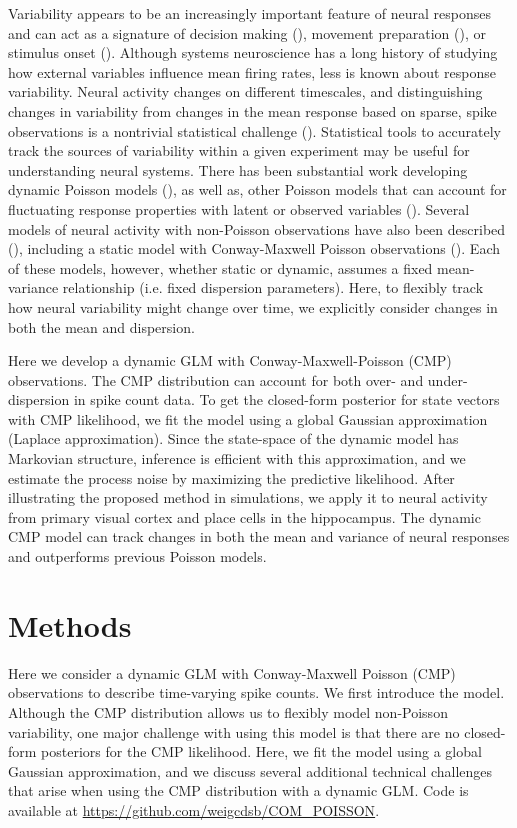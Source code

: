 \documentclass[]{article}
\begin{document}
	Variability appears to be an increasingly important feature of neural responses and can act as a signature of decision making (\cite{Churchland2011}), movement preparation (\cite{Churchland2006}), or stimulus onset (\cite{Churchland2010}). Although systems neuroscience has a long history of studying how external variables influence mean firing rates, less is known about response variability. Neural activity changes on different timescales, and distinguishing changes in variability from changes in the mean response based on sparse, spike observations is a nontrivial statistical challenge (\cite{DeWeese1998}). Statistical tools to accurately track the sources of variability within a given experiment may be useful for understanding neural systems. There has been substantial work developing dynamic Poisson models (\cite{Brown2001,Eden2004}), as well as, other Poisson models that can account for fluctuating response properties with latent or observed variables (\cite{Czanner2008,Smith2003}). Several models of neural activity with non-Poisson observations have also been described (\cite{DeWeese2003,Gao2015,Pillow2012}), including a static model with Conway-Maxwell Poisson observations (\cite{Stevenson2016}). Each of these models, however, whether static or dynamic, assumes a fixed mean-variance relationship (i.e. fixed dispersion parameters). Here, to flexibly track how neural variability might change over time, we explicitly consider changes in both the mean and dispersion.
	
	Here we develop a dynamic GLM with Conway-Maxwell-Poisson (CMP) observations. The CMP distribution can account for both over- and under-dispersion in spike count data. To get the closed-form posterior for state vectors with CMP likelihood, we fit the model using a global Gaussian approximation (Laplace approximation). Since the state-space of the dynamic model has Markovian structure, inference is efficient with this approximation, and we estimate the process noise by maximizing the predictive likelihood. After illustrating the proposed method in simulations, we apply it to neural activity from primary visual cortex and place cells in the hippocampus. The dynamic CMP model can track changes in both the mean and variance of neural responses and outperforms previous Poisson models.
	
	\section{Methods}
	Here we consider a dynamic GLM with Conway-Maxwell Poisson (CMP) observations to describe time-varying spike counts. We first introduce the model. Although the CMP distribution allows us to flexibly model non-Poisson variability, one major challenge with using this model is that there are no closed-form posteriors for the CMP likelihood. Here, we fit the model using a global Gaussian approximation, and we discuss several additional technical challenges that arise when using the CMP distribution with a dynamic GLM. Code is available at \url{https://github.com/weigcdsb/COM_POISSON}. 
	
\end{document}
